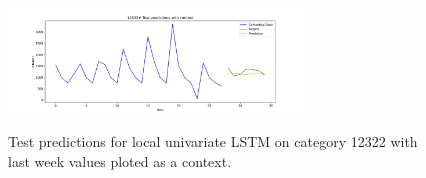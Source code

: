 \begin{figure}
  \centering
  \caption{Test predictions for local univariate LSTM on category 12322 with last week values ploted as a context.}
  \includegraphics[width=0.7\textwidth]{./figs/results/predictions/12322_Test_predictions_with_context.png}
  \hfill
  \label{fig:results:predictions:12322-Test_predictions_with_last_period_context.png}
\end{figure}



